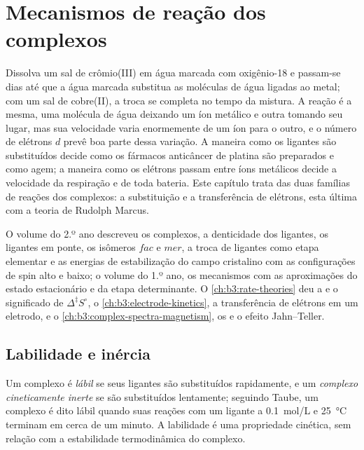 \chapter{Mecanismos de reação dos complexos}\label{ch:b3:complex-mechanisms}

Dissolva um sal de crômio(III) em água marcada com oxigênio-18 e passam-se dias
até que a água marcada substitua as moléculas de água ligadas ao
metal; com um sal de cobre(II), a troca se completa no tempo da
mistura. A reação é a mesma, uma molécula de água deixando um íon metálico e
outra tomando seu lugar, mas sua velocidade varia enormemente de um íon para o
outro, e o número de elétrons $d$ prevê boa parte dessa variação. A maneira como
os ligantes são substituídos decide como os fármacos anticâncer de platina são preparados e como
agem; a maneira como os elétrons passam entre íons metálicos decide a velocidade
da respiração e de toda bateria. Este capítulo trata das duas famílias de
reações dos complexos: a substituição e a transferência de elétrons, esta última com
a teoria de Rudolph Marcus.

\begin{recall}
O volume do 2.º ano descreveu os complexos, a denticidade dos ligantes, os ligantes
em ponte, os isômeros $fac$ e $mer$, a troca de ligantes como etapa elementar e as
energias de estabilização do campo cristalino com as configurações de spin alto e baixo;
o volume do 1.º ano, os mecanismos com as aproximações do estado estacionário e da etapa
determinante. O \cref{ch:b3:rate-theories} deu a  e o
significado de $\Delta^{\ddagger}S^\circ$, o \cref{ch:b3:electrode-kinetics}, a transferência de elétrons em um
eletrodo, e o \cref{ch:b3:complex-spectra-magnetism}, os  e o
efeito Jahn--Teller.
\end{recall}

\section{Labilidade e inércia}

\begin{definition}\label{def:b3:complex-mechanisms:labile}
Um complexo é \emph{lábil} se seus ligantes são substituídos
rapidamente, e um \emph{complexo cineticamente inerte}
se são substituídos lentamente; seguindo Taube, um complexo é dito lábil quando
suas reações com um ligante a \qty{0.1}{mol/L} e \qty{25}{\celsius} terminam em cerca de um
minuto. A labilidade é uma propriedade cinética, sem relação com a estabilidade
termodinâmica do complexo.
\end{definition}


